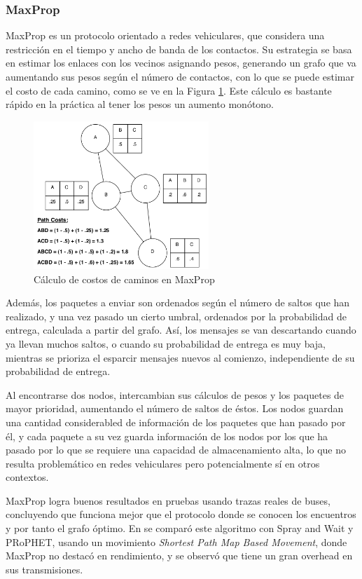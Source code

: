 \subsubsection{MaxProp}
MaxProp\cite{mprop} es un protocolo orientado a redes vehiculares, que considera una restricción en el tiempo y ancho de banda de los contactos. 
Su estrategia se basa en estimar los enlaces con los vecinos asignando pesos, generando un grafo que va aumentando sus pesos según el número de contactos, con lo que se puede estimar el costo de cada camino, como se ve en la Figura \ref{fig:pathcost}. Este cálculo es bastante rápido en la práctica al tener los pesos un aumento monótono.

\begin{figure}[h]
\centering
\includegraphics[width=250px]{pathcost.png}
\caption{Cálculo de costos de caminos en MaxProp \cite{mprop}}
\label{fig:pathcost}
\end{figure}

Además, los paquetes a enviar son ordenados según el número de saltos que han realizado, y una vez pasado un cierto umbral, ordenados por la probabilidad de entrega, calculada a partir del grafo. Así, los mensajes se van descartando cuando ya llevan muchos saltos, o cuando su probabilidad de entrega es muy baja, mientras se prioriza el esparcir mensajes nuevos al comienzo, independiente de su probabilidad de entrega.

Al encontrarse dos nodos, intercambian sus cálculos de pesos y los paquetes de mayor prioridad, aumentando el número de saltos de éstos. Los nodos guardan una cantidad considerabled de información de los paquetes que han pasado por él, y cada paquete a su vez guarda información de los nodos por los que ha pasado por lo que se requiere una capacidad de almacenamiento alta, lo que no resulta problemático en redes vehiculares pero potencialmente sí en otros contextos.

MaxProp logra buenos resultados en pruebas usando trazas reales de buses, concluyendo que funciona mejor que el protocolo donde se conocen los encuentros y por tanto el grafo óptimo. En \cite{mprop2} se comparó este algoritmo con Spray and Wait y PRoPHET, usando un movimiento \emph{Shortest
Path Map Based Movement}, donde MaxProp no destacó en rendimiento, y se observó que tiene un gran overhead en sus transmisiones. 